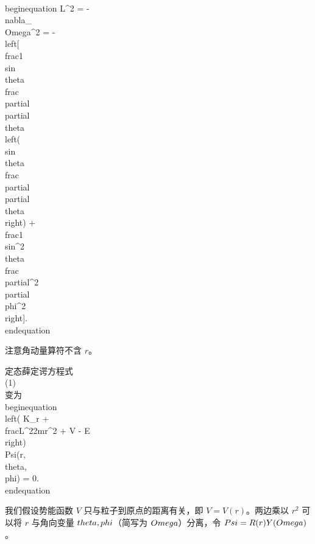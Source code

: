 \\begin{equation}
    L^2 = -\\nabla_\\Omega^2 = -\\left[ \\frac{1}{\\sin \\theta} \\frac{\\partial}{\\partial \\theta} \\left( \\sin \\theta \\frac{\\partial}{\\partial \\theta} \\right) + \\frac{1}{\\sin^2 \\theta} \\frac{\\partial^2}{\\partial \\phi^2} \\right].
\\end{equation}

注意角动量算符不含 $r$。

定态薛定谔方程式 \\ (1) \\ 变为
\\begin{equation}
    \\left( K_r + \\frac{L^2}{2mr^2} + V - E \\right) \\Psi(r, \\theta, \\phi) = 0.
\\end{equation}

我们假设势能函数 $V$ 只与粒子到原点的距离有关，即 $V = V(r)$。两边乘以 $r^2$ 可以将 $r$ 与角向变量 $\\theta, \\phi$（简写为 $\\Omega$）分离，令 $\\Psi = R(r)Y(\\Omega)$。
